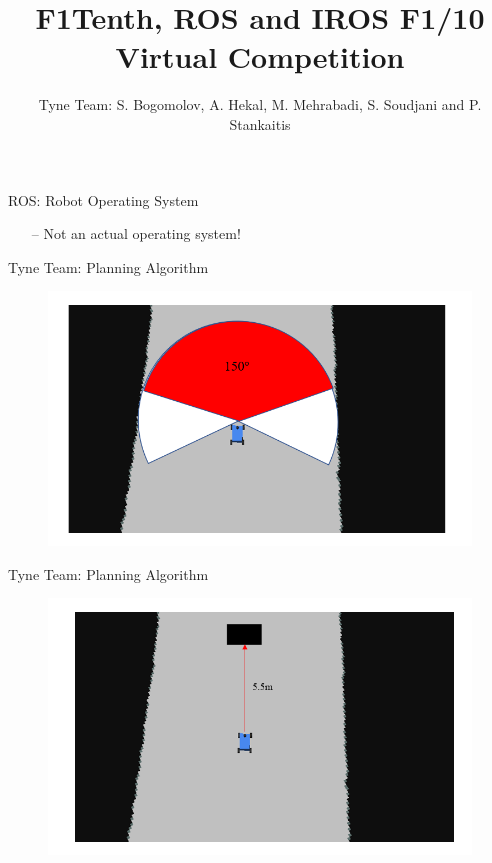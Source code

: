 \documentclass[11pt]{beamer}
\begin{document}
	\author{Tyne Team: S. Bogomolov, A. Hekal, M. Mehrabadi, S. Soudjani and P. Stankaitis}
	\title{F1Tenth, ROS and IROS F1/10 Virtual Competition}
	\begin{frame}[plain]
	\maketitle
\end{frame}


\begin{frame}{ROS: Robot Operating System}
\begin{itemize}
	\item[--] Not an actual operating system!
\end{itemize}
\end{frame}


\begin{frame}{Tyne Team: Planning Algorithm}
\centering
\begin{figure}
	\includegraphics[scale=.4]{img/image1.png}
\end{figure}
\end{frame}

\begin{frame}{Tyne Team: Planning Algorithm}
\begin{figure}
	\includegraphics[scale=.4]{img/image2.png}
\end{figure}
\end{frame}
\end{document}
